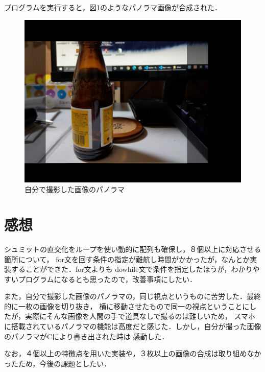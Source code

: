 \documentclass[11pt]{jarticle}
\begin{document}
プログラムを実行すると，図\ref{jibun}のようなパノラマ画像が合成された．
\begin{figure}[t]
  \centering
    \includegraphics[scale=.5]{jibun.jpg}
    \caption{自分で撮影した画像のパノラマ}
    \label{jibun}
  \end{figure}
\section{感想}
シュミットの直交化をループを使い動的に配列も確保し，８個以上に対応させる箇所について，
for文を回す条件の指定が難航し時間がかかったが，なんとか実装することができた．for文よりも
dowhile文で条件を指定したほうが，わかりやすいプログラムになるとも思ったので，改善事項にしたい．

また，自分で撮影した画像のパノラマの，同じ視点というものに苦労した．最終的に一枚の画像を切り抜き，
横に移動させたもので同一の視点ということにしたが，実際にそんな画像を人間の手で道具なしで撮るのは難しいため，
スマホに搭載されているパノラマの機能は高度だと感じた．しかし，自分が撮った画像のパノラマがCにより書き出された時は
感動した．

なお，４個以上の特徴点を用いた実装や，３枚以上の画像の合成は取り組めなかったため，今後の課題としたい．
\end{document}
